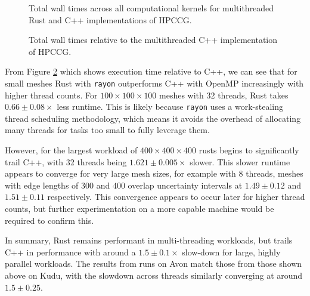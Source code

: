 \begin{figure}[H]
    \centering
    
    \vspace*{-0.5cm}
    \caption{Total wall times across all computational kernels for multithreaded Rust and C++ implementations of HPCCG.}
    \label{fig:5_parallel_line_all}
\end{figure}

\begin{figure}[H]
    \centering
    
    \vspace*{-0.5cm}
    \caption{Total wall times relative to the multithreaded C++ implementation of HPCCG.}
    \label{fig:7_parallel_line_relative}
\end{figure}

From Figure \ref{fig:7_parallel_line_relative} which shows execution time relative to C++, we can see that for small meshes Rust with \texttt{rayon} outperforms C++ with OpenMP increasingly with higher thread counts. For $100 \times 100 \times 100$ meshes with 32 threads, Rust takes $0.66 \pm 0.08 \times$ less runtime. This is likely because \texttt{rayon} uses a work-stealing thread scheduling methodology, which means it avoids the overhead of allocating many threads for tasks too small to fully leverage them.

However, for the largest workload of $400 \times 400 \times 400$ rusts begins to significantly trail C++, with 32 threads being $1.621 \pm 0.005 \times$ slower. This slower runtime appears to converge for very large mesh sizes, for example with 8 threads, meshes with edge lengths of $300$ and $400$ overlap uncertainty intervals at $1.49 \pm 0.12$ and $1.51 \pm 0.11$ respectively. This convergence appears to occur later for higher thread counts, but further experimentation on a more capable machine would be required to confirm this.

In summary, Rust remains performant in multi-threading workloads, but trails C++ in performance with around a $1.5 \pm 0.1\times$ slow-down for large, highly parallel workloads. The results from runs on Avon match those from those shown above on Kudu, with the slowdown across threads similarly converging at around $1.5 \pm 0.25$.

